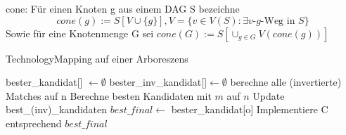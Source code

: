 \documentclass[11pt, a4paper, german]{article}
\begin{document}
\begin{definition}{cone: }Für einen Knoten g aus einem DAG S bezeichne \[cone\left(g\right) := S\left[V\cup\lbrace g\rbrace\right], V = \lbrace v \in V(S) : \exists \text{$v$-$g$-Weg in } S\rbrace\]
Sowie für eine Knotenmenge G sei $cone(G) := S\left[\cup_{g \in G}{V(cone(g))}\right]$
 
\end{definition}


\begin{algorithm}[H]
 \LinesNumbered
 \DontPrintSemicolon
 \caption{TechnologyMapping auf einer Arboreszens}

 bester\_kandidat[] $\gets \emptyset$\;
 bester\_inv\_kandidat[]$ \gets \emptyset$\;
 {
   berechne alle (invertierte) Matches auf n\;
   {
      Berechne besten Kandidaten mit $m$ auf $n$\;
      Update best\_(inv)\_kandidaten\;
   }
 }
 $best\_final \gets$ bester\_kandidat[o] \;
 Implementiere C entsprechend $best\_final$\;
\end{algorithm}\ \\




\end{document}
